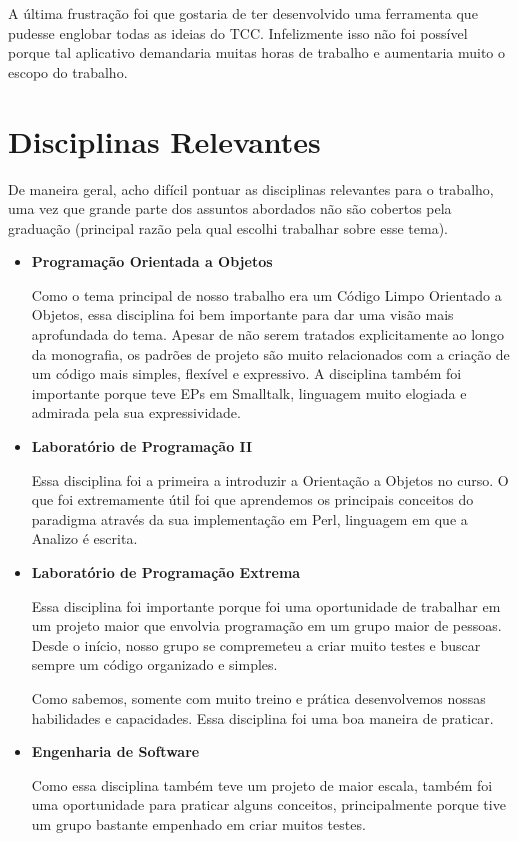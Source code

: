 \documentclass[a4paper, 11pt]{article}
\begin{document}
A última frustração foi que gostaria de ter desenvolvido uma ferramenta que pudesse englobar todas as ideias do TCC.
Infelizmente isso não foi possível porque tal aplicativo demandaria muitas horas de trabalho e aumentaria muito o
escopo do trabalho.

\section{Disciplinas Relevantes}

De maneira geral, acho difícil pontuar as disciplinas relevantes para o trabalho, uma vez que grande parte dos assuntos
abordados não são cobertos pela graduação (principal razão pela qual escolhi trabalhar sobre esse tema).

\begin{itemize}
\item
\textbf{Programação Orientada a Objetos}

Como o tema principal de nosso trabalho era um Código Limpo Orientado a Objetos, essa disciplina foi bem importante
para dar uma visão mais aprofundada do tema. Apesar de não serem tratados explicitamente ao longo da monografia, os
padrões de projeto são muito relacionados com a criação de um código mais simples, flexível e expressivo. A disciplina
também foi importante porque teve EPs em Smalltalk, linguagem muito elogiada e admirada pela sua expressividade.

\item
\textbf{Laboratório de Programação II}

Essa disciplina foi a primeira a introduzir a Orientação a Objetos no curso. O que foi extremamente útil
foi que aprendemos os principais conceitos do paradigma através da sua implementação em Perl, linguagem em
que a Analizo é escrita.

\item
\textbf{Laboratório de Programação Extrema}

Essa disciplina foi importante porque foi uma oportunidade de trabalhar em um projeto maior que envolvia
programação em um grupo maior de pessoas. Desde o início, nosso grupo se compremeteu a criar muito testes
e buscar sempre um código organizado e simples. 

Como sabemos, somente com muito treino e prática desenvolvemos nossas habilidades e capacidades. Essa
disciplina foi uma boa maneira de praticar.

\item
\textbf{Engenharia de Software}

Como essa disciplina também teve um projeto de maior escala, também foi uma oportunidade para
praticar alguns conceitos, principalmente porque tive um grupo bastante empenhado em criar muitos
testes.
	
\end{itemize}
	 
\end{document}
